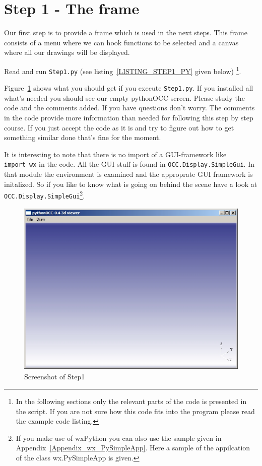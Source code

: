 \section{Step 1 - The frame}
\label{SectionStep1}
Our first step is to provide a frame which is used in the next steps.
This frame consists of a menu where we can hook functions to be selected and a canvas where all our drawings will be displayed.

Read and run {\tt Step1.py} (see listing~\ref{LISTING_STEP1_PY} given below)
\footnote{In the following sections only the relevant parts of the code is presented in the script.
If you are not sure how this code fits into the program please read the example code listing.}.

Figure~\ref{STEP_1_SCREEN} shows what you should get if you execute {\tt Step1.py}.
If you installed all what's needed you should see our empty pythonOCC screen.
Please study the code and the comments added.
If you have questions don't worry.
The comments in the code provide more information than needed for following this step by step course.
If you just accept the code as it is and try to figure out how to get something similar done that's fine for the moment.

It is interesting to note that there is no import of a GUI-framework like {\tt import~wx} in the code.
All the GUI stuff is found in {\tt OCC.Display.SimpleGui}.
In that module the environment is examined and the approprate GUI framework is initalized.
So if you like to know what is going on behind the scene have a look at {\tt OCC.Display.SimpleGui}\footnote{If you make use of wxPython you can also use the sample given in Appendix~\ref{Appendix_wx_PySimpleApp}. Here a sample of the appilcation of the class {wx.PySimpleApp} is given.}.

\begin{figure}[h]
\begin{center}
\includegraphics[height=8.5cm,width=11.3cm]{Step1.jpg}
\end{center}
\caption[Screenshot of Step1]{\label{STEP_1_SCREEN}Screenshot of Step1}
\end{figure}

